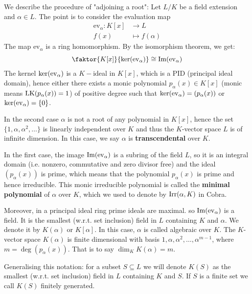 \documentclass[twoside = false,	%
		headsepline,		%
		parskip = true,
		]{scrbook}						%
\begin{document}
        We describe the procedure of "adjoining a root":
        Let $L/K$ be a field extension and $\alpha \in L$. The point is to consider the evaluation map
        \begin{align*}
            \mathrm{ev}_\alpha: K[x] &\rightarrow L \\
                                f(x) &\mapsto f(\alpha)
        \end{align*}
        The map $\mathrm{ev}_\alpha$ is a ring homomorphism. By the isomorphism theorem, we get:
        \begin{equation*}
            \faktor{K[x]}{\Ker(\ev_\alpha)} \cong \Img(\ev_\alpha)
        \end{equation*}
        The kernel $\ker(\mathrm{ev}_\alpha)$ is a $K-$ideal in $K[x]$, which is a PID (principal ideal domain), hence either there exists a monic polynomial $p_\alpha(x) \in K[x]$ (monic means $\mathrm{LK}(p_\alpha(x))=1$) of positive degree such that $\mathrm{ker}(\mathrm{ev}_\alpha) = (p_\alpha(x))$ or $\ker(\mathrm{ev}_\alpha) = \{0\}$.
        
        In the second case $\alpha$ is not a root of any polynomial in $K[x]$, hence the set $\{1,\alpha,\alpha^2,\dots\}$ is linearly independent over $K$ and thus the $K$-vector space $L$ is of infinite dimension. In this case, we say $\alpha$ is \textbf{transcendental} over $K$.
        
        In the first case, the image $\mathrm{Im}(\mathrm{ev}_\alpha)$ is a subring of the field $L$, so it is an integral domain (i.e. nonzero, commutative and zero divisor free) and the ideal $(p_\alpha(x))$ is prime, which means that the polynomial $p_\alpha(x)$ is prime and hence irreducible. This monic irreducible polynomial is called the \textbf{minimal polynomial} of $\alpha$ over $K$, which we used to denote by $\mathrm{Irr}(\alpha,K)$ in Cobra.
        
        Moreover, in a principal ideal ring prime ideals are maximal. so $\mathrm{Im}(\mathrm{ev}_\alpha)$ is a field. It is the smallest (w.r.t. set inclusion) field in $L$ containing $K$ and $\alpha$. We denote it by $K(\alpha)$ or $K[\alpha]$. In this case, $\alpha$ is called algebraic over $K$. The $K$-vector space $K(\alpha)$ is finite dimensional with basis $1,\alpha,\alpha^2,\dots,\alpha^{m-1}$, where $m=\deg\left(p_\alpha(x)\right)$. That is to say $\dim_K K(\alpha) = m$.
        
        Generalising this notation: for a subset $S \subseteq L$ we will denote $K(S)$ as the smallest (w.r.t. set inclusion) field in $L$ containing $K$ and $S$. If $S$ is a finite set we call $K(S)$ finitely generated.
        
\end{document}
